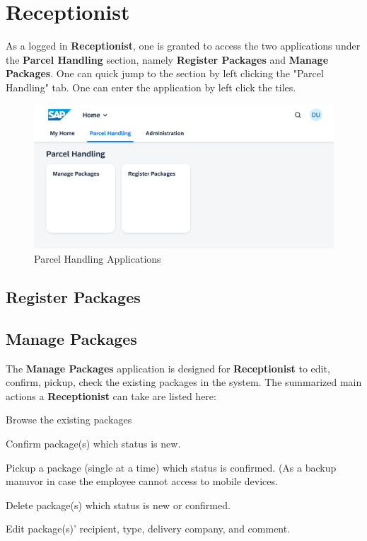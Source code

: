 \pagebreak

\section{Receptionist}

As a logged in \textbf{Receptionist}, one is granted to access the two applications under the \textbf{Parcel Handling} section, namely \textbf{Register Packages} and \textbf{Manage Packages}. One can quick jump to the section by left clicking the "Parcel Handling" tab. One can enter the application by left click the tiles.

\begin{figure}[H]
	\centering
	\includegraphics[width=1\linewidth]{images/user_doc/overviews/ParcelHandlingTab.png}
	\caption{Parcel Handling Applications}
	\label{fig:PHApplications}
\end{figure}


\subsection{Register Packages}

\subsection{Manage Packages}                     


The \textbf{Manage Packages} application is designed for \textbf{Receptionist} to edit, confirm, pickup, check the existing packages in the system. The summarized main actions a \textbf{Receptionist} can take are listed here:

\begin{compactenum}
	\item Browse the existing packages
    \item Confirm package(s) which status is new.
    \item Pickup a package (single at a time) which status is confirmed. (As a backup manuvor in case the employee cannot access to mobile devices.
    \item Delete package(s) which status is new or confirmed.
    \item Edit package(s)' recipient, type, delivery company, and comment.
\end{compactenum}
\bigskip

